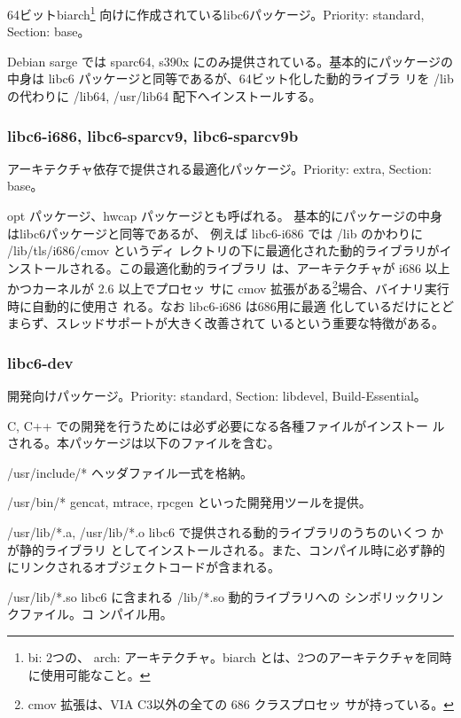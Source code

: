 \documentclass[mingoth,a4paper]{jsarticle}
\newenvironment{gdescription}%
{%
   \begin{list}{}%
   {%
      \setlength{\itemindent}{0mm}
      \setlength{\leftmargin}{45mm}%
      \setlength{\rightmargin}{0zw}%
      \setlength{\labelsep}{4mm}%
      \setlength{\labelwidth}{4cm}%
      \setlength{\itemsep}{0em}%
      \setlength{\parsep}{0cm}%
      \setlength{\listparindent}{0cm}%
      \let\makelabel\gdescriptionlabel
   }
}{%
   \end{list}%
}
\newcommand*\gdescriptionlabel[1]{\hspace\labelsep\normalfont\bfseries #1}
\begin{document}
    64ビットbiarch\footnote{bi: 2つの、
    arch: アーキテクチャ。biarch とは、2つのアーキテクチャを同時に使用可能なこと。}
    向けに作成されているlibc6パッケージ。Priority: standard,
    Section: base。

    Debian sarge では
    sparc64, s390x にのみ提供されている。基本的にパッケージの中身は 
    libc6 パッケージと同等であるが、64ビット化した動的ライブラ
    リを /lib の代わりに /lib64, /usr/lib64 配下へインストールする。

  \subsubsection{libc6-i686, libc6-sparcv9, libc6-sparcv9b}

    アーキテクチャ依存で提供される最適化パッケージ。Priority: extra, Section: base。

    opt パッケージ、hwcap パッケージとも呼ばれる。
    基本的にパッケージの中身はlibc6パッケージと同等であるが、
    例えば libc6-i686 では /lib のかわりに /lib/tls/i686/cmov というディ
    レクトリの下に最適化された動的ライブラリがインストールされる。この最適化動的ライブラリ
    は、アーキテクチャが i686 以上かつカーネルが 2.6 以上でプロセッ
    サに cmov 拡張がある\footnote{cmov 拡張は、VIA C3以外の全ての 686 クラスプロセッ
    サが持っている。}場合、バイナリ実行時に自動的に使用さ
    れる。なお libc6-i686 は686用に最適
    化しているだけにとどまらず、スレッドサポートが大きく改善されて
    いるという重要な特徴がある。

  \subsubsection{libc6-dev}

    開発向けパッケージ。Priority: standard, Section: libdevel, Build-Essential。

    C, C++ での開発を行うためには必ず必要になる各種ファイルがインストー
    ルされる。本パッケージは以下のファイルを含む。

    \begin{gdescription}
      \item[/usr/include/*] ヘッダファイル一式を格納。
      \item[/usr/bin/*] gencat, mtrace, rpcgen といった開発用ツールを提供。
      \item[/usr/lib/*.a, /usr/lib/*.o] libc6 で提供される動的ライブラリのうちのいくつ
		 かが静的ライブラリ
		 としてインストールされる。また、コンパイル時に必ず静的
		 にリンクされるオブジェクトコードが含まれる。
      \item[/usr/lib/*.so] libc6 に含まれる /lib/*.so 動的ライブラリへの
		 シンボリックリンクファイル。コ
		 ンパイル用。
    \end{gdescription}
\end{document}
